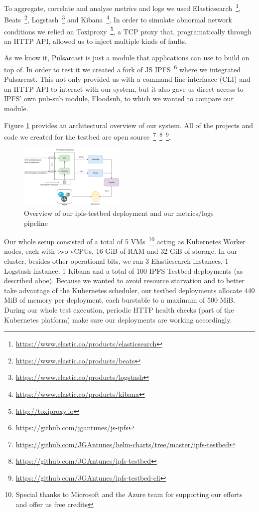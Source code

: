 To aggregate, correlate and analyse metrics and logs we used Elasticsearch~\footnote{\url{https://www.elastic.co/products/elasticsearch}}, Beats~\footnote{\url{https://www.elastic.co/products/beats}}, Logstash~\footnote{\url{https://www.elastic.co/products/logstash}} and Kibana~\footnote{\url{https://www.elastic.co/products/kibana}}. In order to simulate abnormal network conditions we relied on Toxiproxy~\footnote{\url{http://toxiproxy.io}}, a TCP proxy that, programatically through an HTTP API, allowed us to inject multiple kinds of faults.

As we know it, Pulsarcast is just a module that applications can use to build
on top of. In order to test it we created a fork of JS
IPFS~\footnote{\url{https://github.com/jgantunes/js-ipfs}} where we integrated
Pulsarcast. This not only provided us with a command line interfaace (CLI) and
an HTTP API to interact with our system, but it also gave us direct access to
IPFS' own pub-sub module, Floodsub, to which we wanted to compare our module.

Figure \ref{fig:ipfs-testbed-and-metrics} provides an architectural overview of
our system. All of the projects and code we created for the testbed are
open
source~\footnote{\url{https://github.com/JGAntunes/helm-charts/tree/master/ipfs-testbed}}~\footnote{\url{https://github.com/JGAntunes/ipfs-testbed}}~\footnote{\url{https://github.com/JGAntunes/ipfs-testbed-cli}}.

\begin{figure}[!htb]
  \centering
  \includegraphics[width=0.45\textwidth]{img/ipfs-testbed-and-metrics.png}
  \caption{Overview of our ipfs-testbed deployment and our metrics/logs
  pipeline}
  \label{fig:ipfs-testbed-and-metrics}
\end{figure}

Our whole setup consisted of a total of 5 VMs~\footnote{Special thanks to
Microsoft and the Azure team for supporting our efforts and offer us free
credits} acting as Kubernetes Worker nodes, each with two vCPUs, 16 GiB of RAM
and 32 GiB of storage. In our cluster, besides other operational bits, we ran 3
Elasticsearch instances, 1 Logstash instance, 1 Kibana and a total of 100 IPFS
Testbed deployments (as described aboe). Because we wanted to avoid resource
starvation and to better take advantage of the Kubernetes scheduler, our
testbed deployments allocate 440 MiB of memory per deployment, each burstable
to a maximum of 500 MiB. During our whole test execution, periodic HTTP health
checks (part of the Kubernetes platform) make sure our deployments are working
accordingly.

